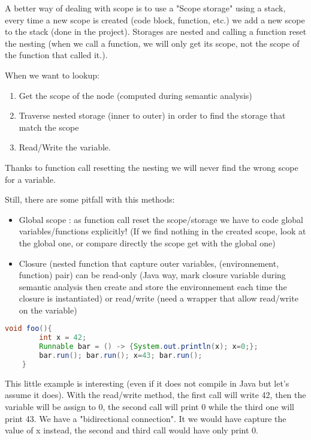 A better way of dealing with scope is to use a "Scope storage" using a stack,
every time a new scope is created (code block, function, etc.) we add a new
scope to the stack (done in the project). Storages are nested and calling a
function reset the nesting (when we call a function, we will only get its scope,
not the scope of the function that called it.).

When we want to lookup:
\begin{enumerate}
    \item Get the scope of the node (computed during semantic analysis)
    \item Traverse nested storage (inner to outer) in order to find the storage that match the scope
    \item Read/Write the variable.
\end{enumerate}
Thanks to function call resetting the nesting we will never find the wrong scope for a variable. 

Still, there are some pitfall with this methods:
\begin{itemize}
    \item Global scope : as function call reset the scope/storage we have to
    code global variables/functions explicitly! (If we find nothing in the
    created scope, look at the global one, or compare directly the scope get
    with the global one)
    \item Closure (nested function that capture outer variables, (environnement,
    function) pair) can be read-only (Java way, mark closure variable during
    semantic analysis then create and store the environnement each time the
    closure is instantiated) or read/write (need a wrapper that allow read/write
    on the variable)
\end{itemize}

\begin{lstlisting}[language=Java]
    void foo(){
        int x = 42;
        Runnable bar = () -> {System.out.println(x); x=0;};
        bar.run(); bar.run(); x=43; bar.run();
    }
\end{lstlisting}
This little example is interesting (even if it does not compile in Java but
let's assume it does). With the read/write method, the first call will write 42,
then the variable will be assign to 0, the second call will print 0 while the
third one will print 43. We have a "bidirectional connection". It we would have
capture the value of x instead, the second and third call would have only print
0. 

